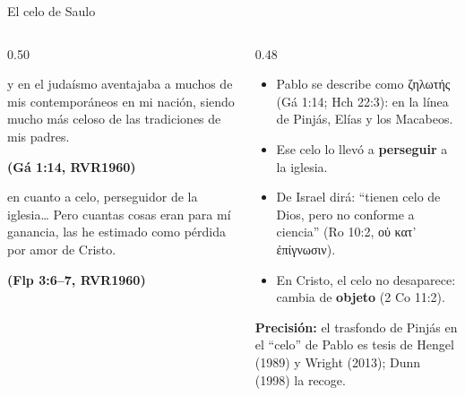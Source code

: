 \documentclass[hyperref={bookmarks=false},aspectratio=169]{beamer}
\newcommand{\grc}[1]{\foreignlanguage{ancientgreek}{#1}}
\newcommand{\fuente}[1]{\par\hfill{\upshape\bfseries\footnotesize\textcolor{azul}{#1}}}
\newcommand{\destacar}[1]{\textbf{\textcolor{azul}{#1}}}
\newcommand{\precision}[1]{{\footnotesize\color{gris}\textbf{Precisión:} #1}}
\begin{document}
\begin{frame}{El celo de Saulo}
\begin{columns}[t,onlytextwidth]
\begin{column}{0.50\textwidth}
\begin{cita}y en el judaísmo aventajaba a muchos de mis contemporáneos en mi nación, siendo mucho más celoso de las tradiciones de mis padres.\fuente{(Gá 1:14, RVR1960)}\end{cita}
\begin{cita}en cuanto a celo, perseguidor de la iglesia\ldots{} Pero cuantas cosas eran para mí ganancia, las he estimado como pérdida por amor de Cristo.\fuente{(Flp 3:6--7, RVR1960)}\end{cita}
\end{column}
\begin{column}{0.48\textwidth}\small
\begin{itemize}
\item Pablo se describe como \grc{ζηλωτής} (Gá 1:14; Hch 22:3): en la línea de Pinjás, Elías y los Macabeos.
\item Ese celo lo llevó a \destacar{perseguir} a la iglesia.
\item De Israel dirá: ``tienen celo de Dios, pero no conforme a ciencia'' (Ro 10:2, \grc{οὐ κατ’ ἐπίγνωσιν}).
\item En Cristo, el celo no desaparece: cambia de \destacar{objeto} (2 Co 11:2).
\end{itemize}
\precision{el trasfondo de Pinjás en el ``celo'' de Pablo es tesis de Hengel (1989) y Wright (2013); Dunn (1998) la recoge.}
\end{column}
\end{columns}
\end{frame}
\end{document}
